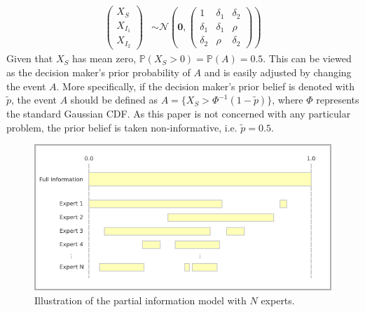 \documentclass[11pt,twoside]{article}
\renewcommand{\P}{\mathbb{P}}
\theoremstyle{definition}
\theoremstyle{definition}
\begin{document}
\begin{align}
\left(\begin{matrix} X_S \\ X_{I_1}\\ X_{I_2} \end{matrix}\right) &\sim \mathcal{N}\left(
 \boldsymbol{0},  \left(\begin{matrix} 
1 & \delta_1 & \delta_2\\
\delta_1 & \delta_1 &\rho\\
\delta_2 & \rho & \delta_2
 \end{matrix}\right)\right) \label{twoExperts}
\end{align}
Given that $X_S$ has mean zero, $\P(X_S > 0) = \P(A) = 0.5$. This can be viewed as the decision maker's prior probability of $A$ and is easily adjusted by changing the event $A$. More specifically, if the decision maker's prior belief is denoted with $\tilde{p}$, the event $A$ should be defined as $A = \{ X_S > \Phi^{-1}(1-\tilde{p}) \}$, where $\Phi$ represents the standard Gaussian CDF. As this paper is not concerned with any particular problem, the prior belief is taken non-informative, i.e. $\tilde{p} = 0.5$.  

\begin{figure}[htbp]
   \includegraphics[width = \textwidth]{N=N} %
   \caption{Illustration of the partial information model with $N$ experts.}
   \label{diagramN}
\end{figure}
\end{document}
